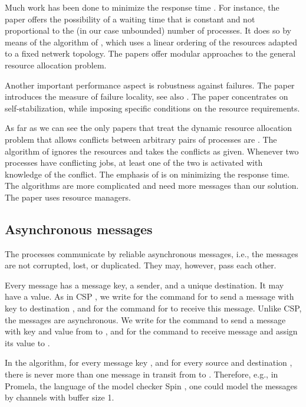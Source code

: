 \documentclass[10pt]{article} \usepackage[english]{babel}
\begin{document}
Much work has been done to minimize the response time
\cite{AwS90,ChS92,PJC93,Rhe98,WeL93}. For instance, the paper
\cite{WeL93} offers the possibility of a waiting time that is constant
and not proportional to the (in our case unbounded) number of
processes. It does so by means of the algorithm of \cite{Lyn81}, which
uses a linear ordering of the resources adapted to a fixed netwerk
topology.  The papers \cite{Rhe98,WeL93} offer modular approaches to
the general resource allocation problem.

Another important performance aspect is robustness against
failures. The paper \cite{ChS92} introduces the measure of failure
locality, see also \cite{SPS00}. The paper \cite{DGR05} concentrates
on self-stabilization, while imposing specific conditions on the
resource requirements.

As far as we can see the only papers that treat the dynamic resource
allocation problem that allows conflicts between arbitrary pairs of
processes are \cite{AwS90,Rhe98}.  The algorithm of \cite{AwS90}
ignores the resources and takes the conflicts as given. Whenever two
processes have conflicting jobs, at least one of the two is activated
with knowledge of the conflict.  The emphasis of \cite{AwS90,Rhe98} is
on minimizing the response time.  The algorithms are more complicated
and need more messages than our solution.  The paper \cite{Rhe98} uses
resource managers.

\subsection{Asynchronous messages} \label{async}

The processes communicate by reliable asynchronous messages, i.e., the
messages are not corrupted, lost, or duplicated.  They may, however,
pass each other.

Every message has a message key, a sender, and a unique destination.
It may have a value.  As in CSP \cite{Hoa85}, we write  for
the command for  to send a message with key  to destination ,
and  for the command for  to receive this message.
Unlike CSP, the messages are asynchronous.  We write  for
the command to send a message with key  and value  from  to
, and  for the command to receive message  and
assign its value to .

In the algorithm, for every message key , and for every source 
and destination , there is never more than one message in transit
from  to . Therefore, e.g., in Promela, the language of the
model checker Spin \cite{Hol04}, one could model the messages by
channels with buffer size 1.  
\end{document}
